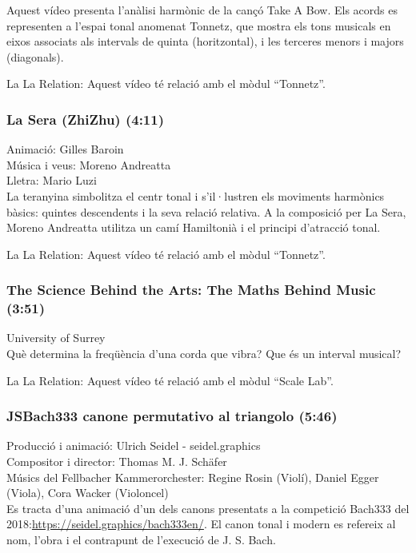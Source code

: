 Aquest vídeo presenta l'anàlisi harmònic de la cançó Take A Bow. Els acords es representen a l'espai tonal anomenat Tonnetz, que mostra els tons musicals en eixos associats als intervals de quinta (horitzontal), i les terceres menors i majors (diagonals).

La La Relation: Aquest vídeo té relació amb el mòdul ``Tonnetz''.

\subsubsection*{La Sera (ZhiZhu) (4:11)}
Animació: Gilles Baroin\\
Música i veus: Moreno Andreatta\\
Lletra: Mario Luzi\\

La teranyina simbolitza el centr tonal i s'il·lustren els moviments harmònics bàsics: quintes descendents i la seva relació relativa. A la composició per La Sera, Moreno Andreatta utilitza un camí Hamiltonià i el principi d'atracció tonal.

La La Relation: Aquest vídeo té relació amb el mòdul ``Tonnetz''.

\subsubsection*{The Science Behind the Arts: The Maths Behind Music (3:51)}
University of Surrey\\

Què determina la freqüència d'una corda que vibra? Que és un interval musical?

La La Relation: Aquest vídeo té relació amb el mòdul ``Scale Lab''.

\subsubsection*{JSBach333 canone permutativo al triangolo (5:46)}
Producció i animació: Ulrich Seidel - seidel.graphics\\
Compositor i director: Thomas M. J. Schäfer\\
Músics del Fellbacher Kammerorchester: Regine Rosin (Violí), Daniel Egger (Viola), Cora Wacker (Violoncel) \\

Es tracta d'una animació d'un dels canons presentats a la competició Bach333 del 2018:\url{https://seidel.graphics/bach333en/}. El canon tonal i modern es refereix al nom, l'obra i el contrapunt de l'execució de J. S. Bach.

